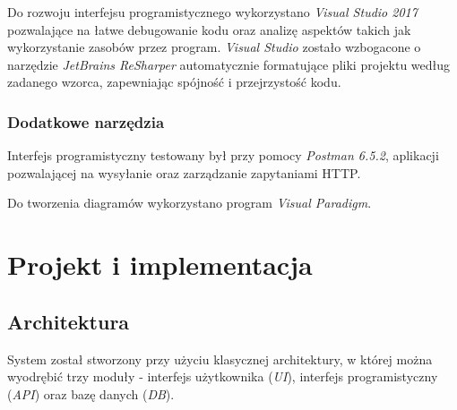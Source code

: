 \documentclass[eng,printmode,openany]{mgr}
\begin{document}
	Do rozwoju interfejsu programistycznego wykorzystano \textit{Visual Studio 2017} pozwalające na łatwe debugowanie kodu oraz analizę aspektów takich jak wykorzystanie zasobów przez program. \textit{Visual Studio} zostało wzbogacone o narzędzie \textit{JetBrains ReSharper} automatycznie formatujące pliki projektu według zadanego wzorca, zapewniając spójność i przejrzystość kodu.
	\subsection{Dodatkowe narzędzia}
	Interfejs programistyczny testowany był przy pomocy \textit{Postman 6.5.2}, aplikacji pozwalającej na wysyłanie oraz zarządzanie zapytaniami HTTP.
	
	Do tworzenia diagramów wykorzystano program \textit{Visual Paradigm}.
	
	\newpage
	\chapter{Projekt i implementacja}
	\section{Architektura}
	System został stworzony przy użyciu klasycznej architektury, w której można wyodrębić trzy moduły - interfejs użytkownika (\textit{UI}), interfejs programistyczny (\textit{API}) oraz bazę danych (\textit{DB}). 
	
\end{document}
